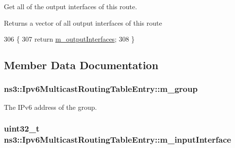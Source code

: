 Get all of the output interfaces of this route. 

\begin{DoxyReturn}{Returns}
a vector of all output interfaces of this route 
\end{DoxyReturn}

\begin{DoxyCode}
306 \{
307   \textcolor{keywordflow}{return} \hyperlink{classns3_1_1Ipv6MulticastRoutingTableEntry_acf08ac7c14676053f91726482c5c7a39}{m\_outputInterfaces};
308 \}
\end{DoxyCode}


\subsection{Member Data Documentation}
\subsubsection[{\texorpdfstring{m\+\_\+group}{m_group}}]{ ns3\+::\+Ipv6\+Multicast\+Routing\+Table\+Entry\+::m\+\_\+group\hspace{0.3cm}{\ttfamily [private]}}\hypertarget{classns3_1_1Ipv6MulticastRoutingTableEntry_adf2e6759d1de21cc570cb7dd850b1650}{}\label{classns3_1_1Ipv6MulticastRoutingTableEntry_adf2e6759d1de21cc570cb7dd850b1650}


The I\+Pv6 address of the group. 

\subsubsection[{\texorpdfstring{m\+\_\+input\+Interface}{m_inputInterface}}]{\setlength{\rightskip}{0pt plus 5cm}uint32\+\_\+t ns3\+::\+Ipv6\+Multicast\+Routing\+Table\+Entry\+::m\+\_\+input\+Interface\hspace{0.3cm}{\ttfamily [private]}}\hypertarget{classns3_1_1Ipv6MulticastRoutingTableEntry_a8e8435624d0596fd1e8fda6abc0e0d91}{}\label{classns3_1_1Ipv6MulticastRoutingTableEntry_a8e8435624d0596fd1e8fda6abc0e0d91}


